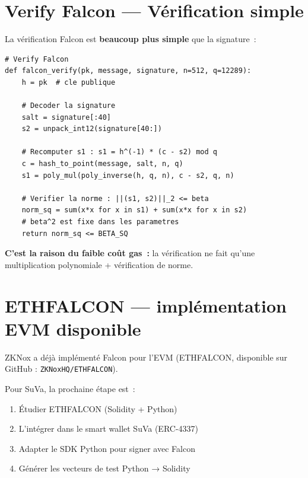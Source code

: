 \documentclass[12pt, a4paper]{article}
\begin{document}
\section{Verify Falcon --- Vérification simple}

La vérification Falcon est \textbf{beaucoup plus simple} que la signature~:

\begin{lstlisting}[style=python]
# Verify Falcon
def falcon_verify(pk, message, signature, n=512, q=12289):
    h = pk  # cle publique

    # Decoder la signature
    salt = signature[:40]
    s2 = unpack_int12(signature[40:])

    # Recomputer s1 : s1 = h^(-1) * (c - s2) mod q
    c = hash_to_point(message, salt, n, q)
    s1 = poly_mul(poly_inverse(h, q, n), c - s2, q, n)

    # Verifier la norme : ||(s1, s2)||_2 <= beta
    norm_sq = sum(x*x for x in s1) + sum(x*x for x in s2)
    # beta^2 est fixe dans les parametres
    return norm_sq <= BETA_SQ
\end{lstlisting}

\textbf{C'est la raison du faible coût gas~:} la vérification ne fait
qu'une multiplication polynomiale + vérification de norme.

\section{ETHFALCON --- implémentation EVM disponible}

\begin{importantbox}
ZKNox a déjà implémenté Falcon pour l'EVM (ETHFALCON, disponible sur
GitHub : \texttt{ZKNoxHQ/ETHFALCON}).

Pour SuVa, la prochaine étape est~:
\begin{enumerate}
  \item Étudier ETHFALCON (Solidity + Python)
  \item L'intégrer dans le smart wallet SuVa (ERC-4337)
  \item Adapter le SDK Python pour signer avec Falcon
  \item Générer les vecteurs de test Python → Solidity
\end{enumerate}
\end{importantbox}
\end{document}

